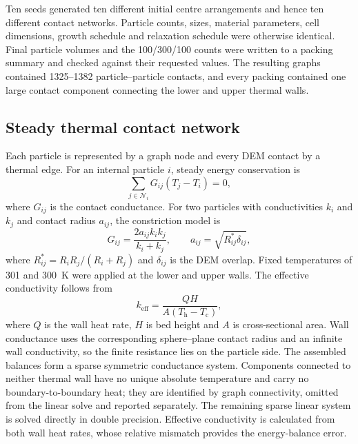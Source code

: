 \documentclass[12pt,a4paper]{article}
\begin{document}
	Ten seeds generated ten different initial centre arrangements and hence ten
	different contact networks. Particle counts, sizes, material parameters, cell
	dimensions, growth schedule and relaxation schedule were otherwise identical.
	Final particle volumes and the 100/300/100 counts were written to a packing
	summary and checked against their requested values. The resulting graphs
	contained 1325--1382 particle--particle contacts, and every packing contained one
	large contact component connecting the lower and upper thermal walls.
	
	\subsection{Steady thermal contact network}
	
	Each particle is represented by a graph node and every DEM contact by a thermal
	edge. For an internal particle $i$, steady energy conservation is
	\begin{equation}
		\sum_{j\in\mathcal N_i}G_{ij}(T_j-T_i)=0,
		\label{eq:balance}
	\end{equation}
	where $G_{ij}$ is the contact conductance. For two particles with conductivities
	$k_i$ and $k_j$ and contact radius $a_{ij}$, the constriction model is
	\begin{equation}
		G_{ij}=\frac{2a_{ij}k_i k_j}{k_i+k_j},
		\qquad
		a_{ij}=\sqrt{R_{ij}^{*}\delta_{ij}},
		\label{eq:conductance}
	\end{equation}
	where $R_{ij}^{*}=R_iR_j/(R_i+R_j)$ and $\delta_{ij}$ is the DEM overlap. Fixed
	temperatures of 301 and 300~K were applied at the lower and upper walls. The
	effective conductivity follows from
	\begin{equation}
		k_{\mathrm{eff}}=\frac{QH}{A(T_{\mathrm h}-T_{\mathrm c})},
		\label{eq:keff}
	\end{equation}
	where $Q$ is the wall heat rate, $H$ is bed height and $A$ is cross-sectional
	area. Wall conductance uses the corresponding sphere--plane contact radius and
	an infinite wall conductivity, so the finite resistance lies on the particle
	side. The assembled balances form a sparse symmetric conductance system.
	Components connected to neither thermal wall have no unique absolute
	temperature and carry no boundary-to-boundary heat; they are identified by graph
	connectivity, omitted from the linear solve and reported separately. The
	remaining sparse linear system is solved directly in double precision. Effective
	conductivity is calculated from both wall heat rates, whose relative mismatch
	provides the energy-balance error.
	
\end{document}
